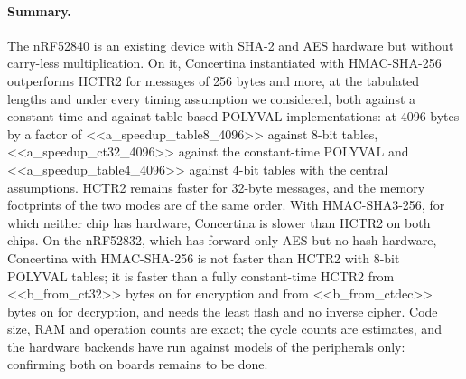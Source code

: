 \paragraph{Summary.}
The nRF52840 is an existing device with SHA-2 and AES hardware but without
carry-less multiplication. On it, Concertina instantiated with HMAC-SHA-256
outperforms HCTR2 for messages of 256 bytes and more, at the tabulated
lengths and under every timing assumption we considered, both against a
constant-time and against table-based POLYVAL implementations: at 4096
bytes by a factor of <<a_speedup_table8_4096>> against 8-bit tables,
<<a_speedup_ct32_4096>> against the constant-time POLYVAL and
<<a_speedup_table4_4096>> against 4-bit tables with the central assumptions.
HCTR2 remains faster for 32-byte messages, and the memory footprints of the
two modes are of the same order. With HMAC-SHA3-256, for which neither chip
has hardware, Concertina is slower than HCTR2 on both chips. On the
nRF52832, which has forward-only AES but no hash hardware, Concertina with
HMAC-SHA-256 is not faster than HCTR2 with 8-bit POLYVAL tables; it is
faster than a fully constant-time HCTR2 from <<b_from_ct32>> bytes on for
encryption and from <<b_from_ctdec>> bytes on for decryption, and needs the
least flash and no inverse cipher. Code size, RAM and operation counts are
exact; the cycle counts are estimates, and the hardware backends have run
against models of the peripherals only: confirming both on boards remains
to be done.
